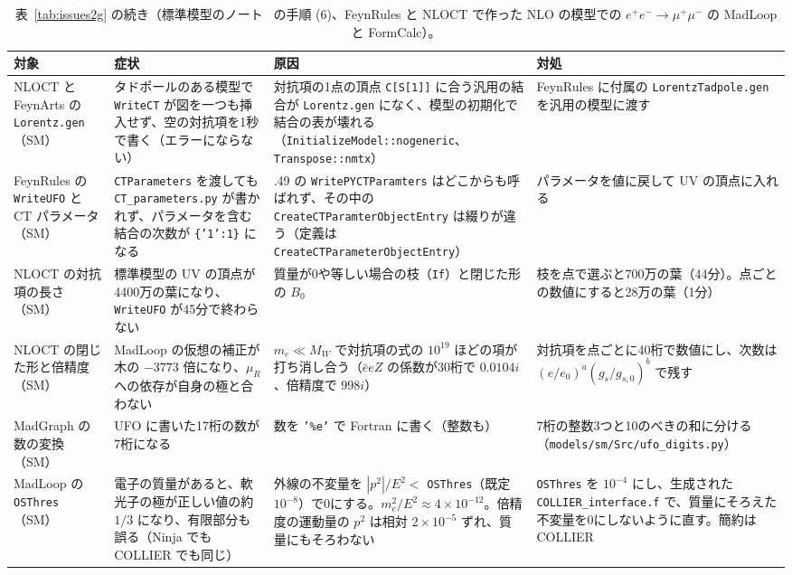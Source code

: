 \documentclass[a4paper,10pt]{ltjsarticle}
\begin{document}
\begin{table}[tbp]
\centering\footnotesize
\caption{表~\ref{tab:issues2g} の続き（標準模型のノート~\cite{smnote} の手順 (6)、FeynRules と NLOCT で作った NLO の模型での $e^+e^-\to\mu^+\mu^-$ の MadLoop と FormCalc）。}
\label{tab:issues2h}
\begin{tabularx}{\linewidth}{>{\raggedright\arraybackslash}p{2.4cm}>{\raggedright\arraybackslash}X>{\raggedright\arraybackslash}X>{\raggedright\arraybackslash}X}
\toprule
\textbf{対象} & \textbf{症状} & \textbf{原因} & \textbf{対処} \\
\midrule
NLOCT と FeynArts の \texttt{Lorentz.gen}（SM） & タドポールのある模型で \texttt{WriteCT} が図を一つも挿入せず、空の対抗項を1秒で書く（エラーにならない） & 対抗項の1点の頂点 \texttt{C[S[1]]} に合う汎用の結合が \texttt{Lorentz.gen} になく、模型の初期化で結合の表が壊れる（\texttt{InitializeModel::nogeneric}、\texttt{Transpose::nmtx}） & FeynRules に付属の \texttt{LorentzTadpole.gen} を汎用の模型に渡す \\
FeynRules の \texttt{WriteUFO} と CT パラメータ（SM） & \texttt{CTParameters} を渡しても \texttt{CT\_parameters.py} が書かれず、パラメータを含む結合の次数が \texttt{\{'1':1\}} になる & 2.3.49 の \texttt{WritePYCTParamters} はどこからも呼ばれず、その中の \texttt{CreateCTParamterObjectEntry} は綴りが違う（定義は \texttt{CreateCTParameterObjectEntry}） & パラメータを値に戻して UV の頂点に入れる \\
NLOCT の対抗項の長さ（SM） & 標準模型の UV の頂点が4400万の葉になり、\texttt{WriteUFO} が45分で終わらない & 質量が0や等しい場合の枝（\texttt{If}）と閉じた形の $B_0$ & 枝を点で選ぶと700万の葉（44分）。点ごとの数値にすると28万の葉（1分） \\
NLOCT の閉じた形と倍精度（SM） & MadLoop の仮想の補正が木の $-3773$ 倍になり、$\mu_R$ への依存が自身の極と合わない & $m_e\ll M_W$ で対抗項の式の $10^{19}$ ほどの項が打ち消し合う（$\bar eeZ$ の係数が30桁で $0.0104i$、倍精度で $998i$） & 対抗項を点ごとに40桁で数値にし、次数は $(e/e_0)^a(g_s/g_{s,0})^b$ で残す \\
MadGraph の数の変換（SM） & UFO に書いた17桁の数が7桁になる & 数を \texttt{'\%e'} で Fortran に書く（整数も） & 7桁の整数3つと10のべきの和に分ける（\nolinkurl{models/sm/Src/ufo_digits.py}） \\
MadLoop の \texttt{OSThres}（SM） & 電子の質量があると、軟光子の極が正しい値の約 $1/3$ になり、有限部分も誤る（Ninja でも COLLIER でも同じ） & 外線の不変量を $|p^2|/E^2<$ \texttt{OSThres}（既定 $10^{-8}$）で0にする。$m_e^2/E^2\approx4\times10^{-12}$。倍精度の運動量の $p^2$ は相対 $2\times10^{-5}$ ずれ、質量にもそろわない & \texttt{OSThres} を $10^{-4}$ にし、生成された \texttt{COLLIER\_interface.f} で、質量にそろえた不変量を0にしないように直す。簡約は COLLIER \\

\end{tabularx}
\end{table}
\end{document}
